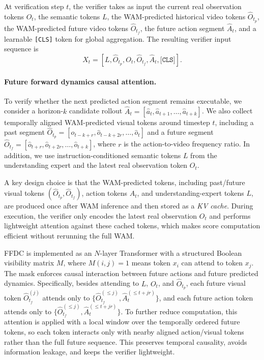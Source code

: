 \documentclass{article}
\begin{document}
At verification step \(t\), the verifier takes as input the current real observation tokens \(O_t\), the semantic tokens \(L\), the WAM-predicted historical video tokens \(\hat{O}_{t_p}\), the WAM-predicted future video tokens \(\hat{O}_{t_f}\), the future action segment \(\hat{A}_t\), and a learnable \texttt{[CLS]} token for global aggregation. The resulting verifier input sequence is
\begin{equation}
X_t = [L,\hat{O}_{t_p},O_t,\hat{O}_{t_f},\hat{A}_t,\texttt{[CLS]}].
\end{equation}

\paragraph{Future forward dynamics causal attention.}
To verify whether the next predicted action segment remains executable, we consider a horizon-\(k\) candidate rollout
\(
\hat{A}_t=[\hat{a}_t,\hat{a}_{t+1},\dots,\hat{a}_{t+k}]
\).
We also collect temporally aligned WAM-predicted visual tokens around timestep \(t\), including a past segment
\(
\hat{O}_{t_p}=[\hat{o}_{t-k+r},\hat{o}_{t-k+2r},\dots,\hat{o}_{t}]
\)
and a future segment
\(
\hat{O}_{t_f}=[\hat{o}_{t+r},\hat{o}_{t+2r},\dots,\hat{o}_{t+k}]
\),
where \(r\) is the action-to-video frequency ratio. In addition, we use instruction-conditioned semantic tokens \(L\) from the understanding expert and the latest real observation token \(O_t\).

A key design choice is that the WAM-predicted tokens, including past/future visual tokens \((\hat{O}_{t_p}, \hat{O}_{t_f})\), action tokens \(\hat{A}_t\), and understanding-expert tokens \(L\), are produced once after WAM inference and then stored as a \emph{KV cache}. During execution, the verifier only encodes the latest real observation \(O_t\) and performs lightweight attention against these cached tokens, which makes score computation efficient without rerunning the full WAM.

FFDC is implemented as an \(N\)-layer Transformer with a structured Boolean visibility matrix \(M\), where \(M(i,j)=1\) means token \(x_i\) can attend to token \(x_j\). The mask enforces causal interaction between future actions and future predicted dynamics. Specifically, besides attending to \(L\), \(O_t\), and \(\hat{O}_{t_p}\), each future visual token \(\hat{O}_{t_f}^{(j)}\) attends only to \(\{\hat{O}_{t_f}^{(\leq j)}, \hat{A}_{t}^{(\leq t+jr)}\}\), and each future action token attends only to \(\{\hat{O}_{t_f}^{(\leq j)}, \hat{A}_{t}^{(\leq t+jr)}\}\). To further reduce computation, this attention is applied with a local window over the temporally ordered future tokens, so each token interacts only with nearby aligned action/visual tokens rather than the full future sequence. This preserves temporal causality, avoids information leakage, and keeps the verifier lightweight.
\end{document}
